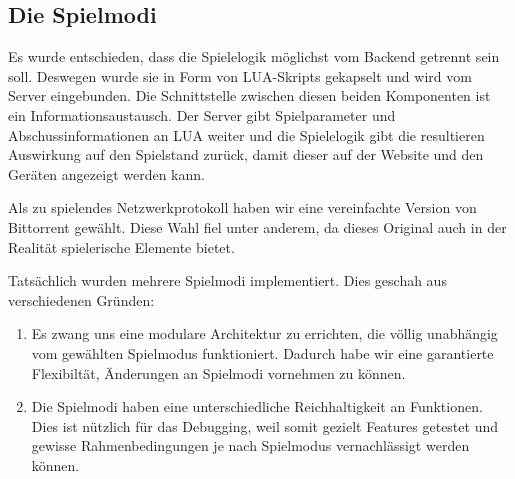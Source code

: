 \subsection{Die Spielmodi}

Es wurde entschieden, dass die Spielelogik möglichst vom Backend getrennt sein soll.
Deswegen wurde sie in Form von LUA-Skripts gekapselt und wird vom Server eingebunden.
Die Schnittstelle zwischen diesen beiden Komponenten ist ein Informationsaustausch.
Der Server gibt Spielparameter und Abschussinformationen an LUA weiter und die Spielelogik gibt die
resultieren Auswirkung auf den Spielstand zurück, damit dieser auf der Website und den Geräten
angezeigt werden kann.

Als zu spielendes Netzwerkprotokoll haben wir eine vereinfachte Version von Bittorrent gewählt.
Diese Wahl fiel unter anderem, da dieses Original auch in der Realität spielerische Elemente bietet.

Tatsächlich wurden mehrere Spielmodi implementiert.
Dies geschah aus verschiedenen Gründen:
\begin{enumerate}
  \item
    Es zwang uns eine modulare Architektur zu errichten, die völlig unabhängig vom gewählten
    Spielmodus funktioniert.
    Dadurch habe wir eine garantierte Flexibiltät, Änderungen an Spielmodi vornehmen zu können.
  \item
    Die Spielmodi haben eine unterschiedliche Reichhaltigkeit an Funktionen.
    Dies ist nützlich für das Debugging, weil somit gezielt Features getestet und gewisse
    Rahmenbedingungen je nach Spielmodus vernachlässigt werden können.
\end{enumerate}
